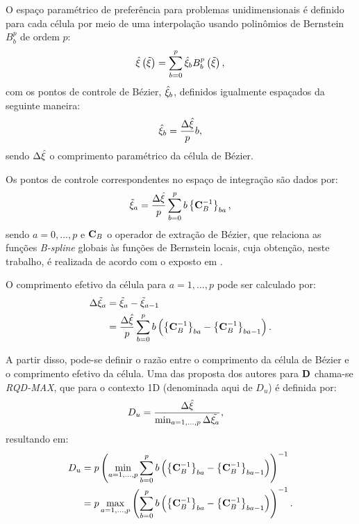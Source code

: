 O espaço paramétrico de preferência para problemas unidimensionais é definido para cada célula por meio de uma interpolação usando polinômios de Bernstein $B_{b}^{p}$ de ordem $p$:
\begin{align}
	\hat{\xi} \left(\tilde{\xi}\right) = \sum_{b=0}^{p} \hat{\xi}_b B_{b}^{p}\left(\tilde{\xi}\right),
\end{align}
\noindent com os pontos de controle de Bézier, $\hat{\xi}_b$, definidos igualmente espaçados da seguinte maneira:
\begin{align}
	\hat{\xi}_b = \frac{\Delta{\hat{\xi}}}{p}b,
\end{align}
\noindent sendo $\Delta{\hat{\xi}}$ o comprimento paramétrico da célula de Bézier. 

Os pontos de controle correspondentes no espaço de integração são dados por:
\begin{align}
	\tilde{\xi}_a = \frac{\Delta{\hat{\xi}}}{p} \sum_{b=0}^{p}b\left\{\mathbf{C}_{B}^{-1}\right\}_{ba},
\end{align}
\noindent sendo $a=0,...,p$ e $\mathbf{C}_{B}$ o operador de extração de Bézier, que relaciona as funções \textit{B-spline} globais às funções de Bernstein locais, cuja obtenção, neste trabalho, é realizada de acordo com o exposto em .

O comprimento efetivo da célula para $a = 1, ..., p$ pode ser calculado por:
\begin{align}
	\Delta{\tilde{\xi}_a} &= \tilde{\xi}_a - \tilde{\xi}_{a-1} \\
		           &= \frac{\Delta{\hat{\xi}}}{p} \sum_{b=0}^{p}b\left(\left\{\mathbf{C}_{B}^{-1}\right\}_{ba} - \left\{\mathbf{C}_{B}^{-1}\right\}_{ba-1}\right).
\end{align}

A partir disso, pode-se definir o razão entre o comprimento da célula de Bézier e o comprimento efetivo da célula. Uma das proposta dos autores para $\mathbf{D}$ chama-se \textit{RQD-MAX}, que para o contexto 1D (denominada aqui de $D_{u}$) é definida por:
\begin{align}
	D_{u}&=\frac{\Delta\hat{\xi}}{\min_{a=1,...,p} \Delta\tilde{\xi_{a}}},
\end{align}
\noindent resultando em:
\begin{align}
	D_{u}&={p}\left(\min_{a=1,...,p} \sum_{b=0}^{p} b \left(\left\{\mathbf{C}_{B}^{-1}\right\}_{ba} - \left\{\mathbf{C}_{B}^{-1}\right\}_{ba-1}\right)\right)^{-1} \\
	  &={p}\max_{a=1,...,p}\left(\sum_{b=0}^{p} b \left(\left\{\mathbf{C}_{B}^{-1}\right\}_{ba} - \left\{\mathbf{C}_{B}^{-1}\right\}_{ba-1}\right)\right)^{-1}.
\end{align}

